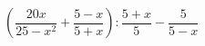 \begin{ex}[type=expression]
	\begin{condition}
		\( \left( \dfrac{20x}{25-x^2}+\dfrac{5-x}{5+x} \right) :\dfrac{5+x}{5}-\dfrac{5}{5-x}\)
	\end{condition}
\end{ex}